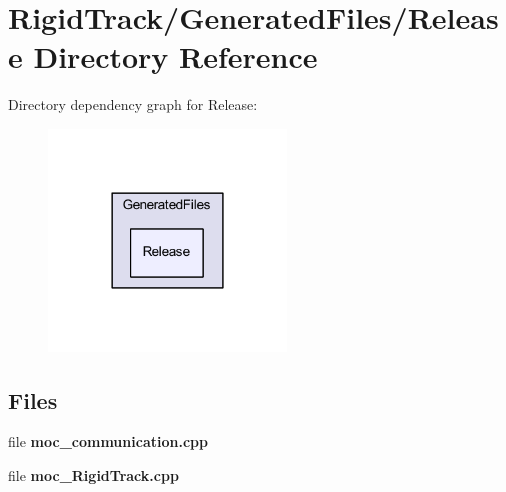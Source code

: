 \section{Rigid\+Track/\+Generated\+Files/\+Release Directory Reference}
\label{dir_a616b9a66cf6ee9700fb02730d672ec3}
Directory dependency graph for Release\+:\nopagebreak
\begin{figure}[H]
\begin{center}
\leavevmode
\includegraphics[width=179pt]{dir_a616b9a66cf6ee9700fb02730d672ec3_dep}
\end{center}
\end{figure}
\subsection*{Files}
\begin{DoxyCompactItemize}
\item 
file \textbf{ moc\+\_\+communication.\+cpp}
\item 
file \textbf{ moc\+\_\+\+Rigid\+Track.\+cpp}
\end{DoxyCompactItemize}
